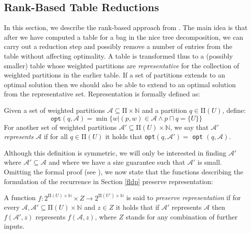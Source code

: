 \documentclass{llncs}
\begin{document}
\subsection{Rank-Based Table Reductions}
In this section, we describe the rank-based approach from \cite{BodlaenderCKN12}. The main idea is that after we have computed a table for a bag in the nice tree
decomposition, we can carry out a reduction step and possibly remove a number of entries from the table without affecting optimality. 
A table is transformed thus to a (possibly smaller) table whose weighted partitions are {\em representative} for the collection of weighted partitions in the earlier table.
If a set of partitions extends to an optimal solution then we should also be able to extend to an optimal solution from the representative set. Representation is formally defined as:
\begin{definition}[Representation]
Given a set of weighted partitions $\mathcal{A} \subseteq \mathrm{\Pi} \times \mathbb{N}$ and a partition $q \in \mathrm{\Pi}(U)$, define:
\[
\texttt{opt}(q,\mathcal{A}) = \min \{ w | (p,w) \in \mathcal{A} \wedge p \sqcap q = \{ U \} \}
\]
For another set of weighted partitions $\mathcal{A}' \subseteq \mathrm{\Pi}(U) \times \mathbb{N}$, we say that $\mathcal{A}'$ \emph{represents} $\mathcal{A}$ if for all $q\in \mathrm{\Pi}(U)$ it holds that \texttt{opt}$(q, \mathcal{A}') =$ \texttt{opt} $(q, \mathcal{A})$.
\end{definition}

Although this definition is symmetric, we will only be interested in finding $\mathcal{A}'$ where $\mathcal{A'}\subseteq\mathcal{A}$ and where we have a size guarantee such that $\mathcal{A}'$ is small.
Omitting the formal proof (see \cite{BodlaenderCKN12}), we now state that the functions describing the formulation of the recurrence in Section \ref{fldp} preserve representation:
\begin{definition}
A function $f:2^{\mathrm{\Pi}(U)\times\mathbb{N}} \times Z \rightarrow 2^{\mathrm{\Pi}(U')\times\mathbb{N}}$ is said to \emph{preserve representation} if for every $\mathcal{A},\mathcal{A}'\subseteq\mathrm{\Pi}(U)\times\mathbb{N}$ and $z\in Z$ it holds that if $\mathcal{A}'$ represents $\mathcal{A}$ then $f(\mathcal{A}',z)$ represents $f(\mathcal{A},z)$, where $Z$ stands for any combination of further inputs.
\end{definition}
\end{document}
